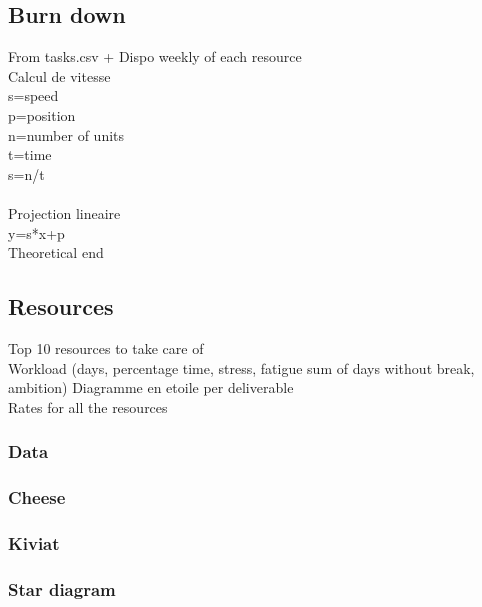 \documentclass[8pt]{article} %
\begin{document}
\subsection{Burn down}
From tasks.csv + Dispo weekly of each resource
\\
Calcul de vitesse\\
s=speed\\
p=position\\
n=number of units\\
t=time\\
s=n/t\\
\\
Projection lineaire\\
y=s*x+p\\
Theoretical end\\





\subsection{Resources}

Top 10 resources to take care of\\
Workload (days, percentage time, stress, fatigue sum of days without break, ambition)
Diagramme en etoile per deliverable\\
Rates for all the resources

\subsubsection{Data}

%
\subsubsection{Cheese}


\subsubsection{Kiviat}


\subsubsection{Star diagram}
\end{document}
